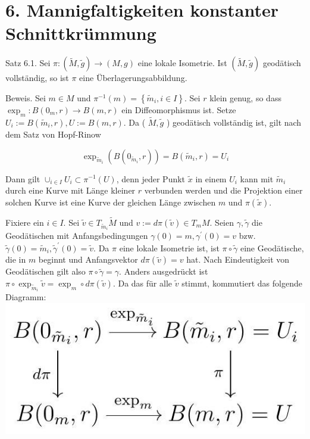 \documentclass[10pt]{article}
\begin{document}
\section*{6. Mannigfaltigkeiten konstanter Schnittkrümmung}
Satz 6.1. Sei $\pi:(\tilde{M}, \tilde{g}) \rightarrow(M, g)$ eine lokale Isometrie. Ist $(\tilde{M}, \tilde{g})$ geodätisch vollständig, so ist $\pi$ eine Überlagerungsabbildung.

Beweis. Sei $m \in M$ und $\pi^{-1}(m)=\left\{\tilde{m}_{i}, i \in I\right\}$. Sei $r$ klein genug, so dass $\exp _{m}: B\left(0_{m}, r\right) \rightarrow B(m, r)$ ein Diffeomorphismus ist. Setze $U_{i}:=B\left(\tilde{m}_{i}, r\right), U:=B(m, r)$. Da ( $\tilde{M}, \tilde{g}$ ) geodätisch vollständig ist, gilt nach dem Satz von Hopf-Rinow

$$
\exp _{\tilde{m}_{i}}\left(B\left(0_{\tilde{m}_{i}}, r\right)\right)=B\left(\tilde{m}_{i}, r\right)=U_{i}
$$

Dann gilt $\cup_{i \in I} U_{i} \subset \pi^{-1}(U)$, denn jeder Punkt $\tilde{x}$ in einem $U_{i}$ kann mit $\tilde{m}_{i}$ durch eine Kurve mit Länge kleiner $r$ verbunden werden und die Projektion einer solchen Kurve ist eine Kurve der gleichen Länge zwischen $m$ und $\pi(\tilde{x})$.

Fixiere ein $i \in I$. Sei $\tilde{v} \in T_{\tilde{m}_{i}} \tilde{M}$ und $v:=d \pi(\tilde{v}) \in T_{m} M$. Seien $\gamma, \tilde{\gamma}$ die Geodätischen mit Anfangsbedingungen $\gamma(0)=m, \gamma^{\prime}(0)=v$ bzw. $\tilde{\gamma}(0)=\tilde{m}_{i}, \tilde{\gamma}^{\prime}(0)=\tilde{v}$. Da $\pi$ eine lokale Isometrie ist, ist $\pi \circ \tilde{\gamma}$ eine Geodätische, die in $m$ beginnt und Anfangsvektor $d \pi(\tilde{v})=v$ hat. Nach Eindeutigkeit von Geodätischen gilt also $\pi \circ \tilde{\gamma}=\gamma$. Anders ausgedrückt ist $\pi \circ \exp _{\tilde{m}_{i}} \tilde{v}=\exp _{m} \circ d \pi(\tilde{v})$. Da das für alle $\tilde{v}$ stimmt, kommutiert das folgende Diagramm:\\
\includegraphics[max width=\textwidth, center]{2025_05_20_3825c151ba0898b77b6eg-083}
\end{document}
